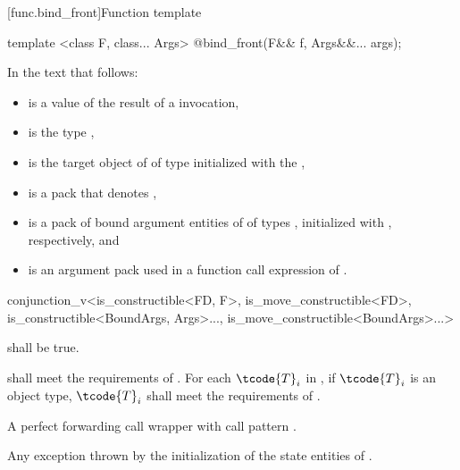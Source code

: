 [func.bind_front]{Function template }

%
\begin{itemdecl}
template <class F, class... Args>
  @\unspec@ bind_front(F&& f, Args&&... args);
\end{itemdecl}

\begin{itemdescr}
\pnum
In the text that follows:
\begin{itemize}
\item {} is a value of the result of a  invocation,
\item {} is the type ,
\item {} is the target object of 
  of type  initialized with
  the  ,
\item {} is a pack
  that denotes ,
\item {} is
  a pack of bound argument entities of 
  of types ,
  initialized with
   ,
  respectively, and
\item {} is an argument pack used in
  a function call expression of .
\end{itemize}

\pnum
\mandates
\begin{codeblock}
conjunction_v<is_constructible<FD, F>, is_move_constructible<FD>,
              is_constructible<BoundArgs, Args>..., is_move_constructible<BoundArgs>...>
\end{codeblock}
shall be true.

\pnum
\expects
{} shall meet the requirements of .
For each $\tcode{T}_i$ in ,
if $\tcode{T}_i$ is an object type,
$\tcode{T}_i$ shall meet the requirements of .

\pnum
\returns
A perfect forwarding call wrapper 
with call pattern .

\pnum
\throws
Any exception thrown by
the initialization of the state entities of .
\end{itemdescr}

